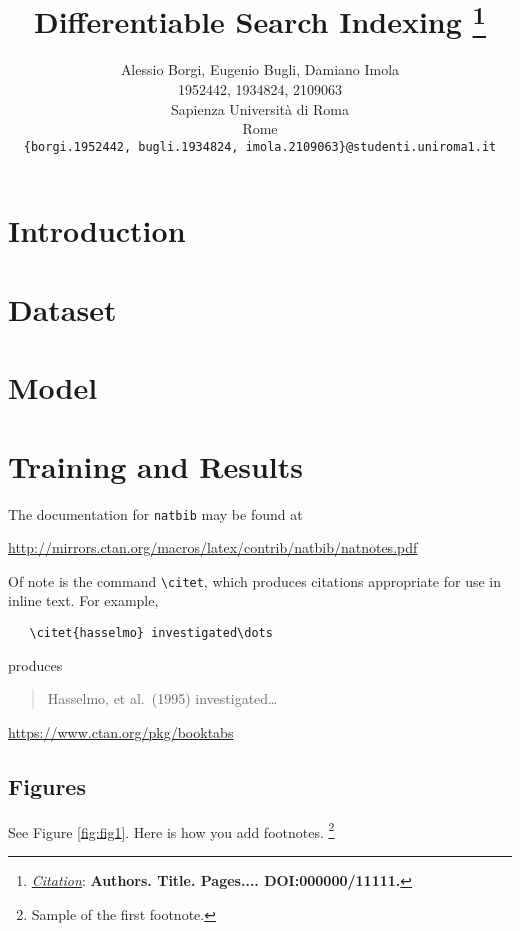 \documentclass{article}
\title{Differentiable Search Indexing
\thanks{\textit{\underline{Citation}}: 
\textbf{Authors. Title. Pages.... DOI:000000/11111.}} 
}
\author{
  Alessio Borgi, Eugenio Bugli, Damiano Imola \\
  1952442, 1934824, 2109063 \\
  Sapienza Università di Roma \\
  Rome\\
  \texttt{\{borgi.1952442, bugli.1934824, imola.2109063\}@studenti.uniroma1.it} \\
}
\begin{document}
\maketitle


\begin{abstract}
\end{abstract}




\section{Introduction} 
\section{Dataset} 

\section{Model} 
\section{Training and Results} 

The documentation for \verb+natbib+ may be found at
\begin{center}
  \url{http://mirrors.ctan.org/macros/latex/contrib/natbib/natnotes.pdf}
\end{center}
Of note is the command \verb+\citet+, which produces citations
appropriate for use in inline text.  For example,
\begin{verbatim}
   \citet{hasselmo} investigated\dots
\end{verbatim}
produces
\begin{quote}
  Hasselmo, et al.\ (1995) investigated\dots
\end{quote}

\begin{center}
  \url{https://www.ctan.org/pkg/booktabs}
\end{center}


\subsection{Figures} 
See Figure \ref{fig:fig1}. Here is how you add footnotes. \footnote{Sample of the first footnote.}
\end{document}

